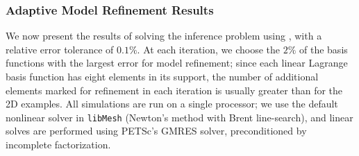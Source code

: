\documentclass[review,sort&compress]{elsarticle}
\begin{document}
\subsubsection{Adaptive Model Refinement Results} \label{sec:ref3D_diffmesh}

We now present the results of solving the inference problem using , with a relative error tolerance of $0.1\%$. At each iteration, we choose the $2\%$ of the basis functions with the largest error for model refinement; since each linear Lagrange basis function has eight elements in its support, the number of additional elements marked for refinement in each iteration is usually greater than for the 2D examples. All simulations are run on a single processor; we use the default nonlinear solver in \texttt{libMesh} \cite{libMeshPaper} (Newton's method with Brent line-search), and linear solves are performed using PETSc's \cite{petsc-user-ref} GMRES solver, preconditioned by incomplete factorization.
\end{document}
